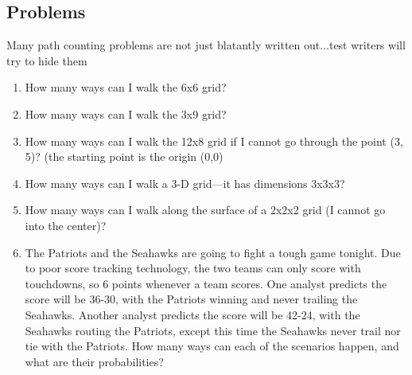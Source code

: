 	\subsection{Problems}
		Many path counting problems are not just blatantly written out...test writers will try to hide them
		
		\begin{enumerate}
			\item How many ways can I walk the 6x6 grid?\vspace{1in}
			\item How many ways can I walk the 3x9 grid?\vspace{1in}
			\item How many ways can I walk the 12x8 grid if I cannot go through the point (3, 5)? (the starting point is the origin (0,0)\vspace{1in}
			\item How many ways can I walk a 3-D grid---it has dimensions 3x3x3?\vspace{1in}
			\item How many ways can I walk along the surface of a 2x2x2 grid (I cannot go into the center)?\vspace{1in}
			\item The Patriots and the Seahawks are going to fight a tough game tonight. Due to poor score tracking technology, the two teams can only score with touchdowns, so 6 points whenever a team scores. One analyst predicts the score will be 36-30, with the Patriots winning and never trailing the Seahawks. Another analyst predicts the score will be 42-24, with the Seahawks routing the Patriots, except this time the Seahawks never trail nor tie with the Patriots. How many ways can each of the scenarios happen, and what are their probabilities?
		\end{enumerate}